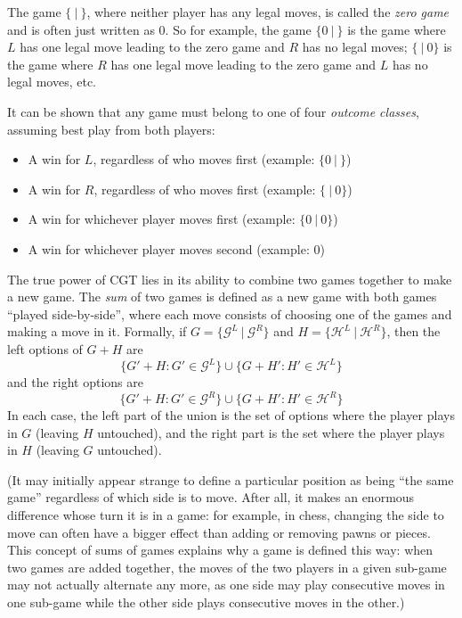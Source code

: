 \documentclass[a4paper,twocolumn]{article}
\newcommand{\cgtgame}[2]{\{#1 \:|\: #2\}}
\begin{document}
The game $\cgtgame{}{}$, where neither player has any legal moves, is
called the \emph{zero game} and is often just written as $0$. So for
example, the game $\cgtgame{0}{}$ is the game where $L$ has one legal
move leading to the zero game and $R$ has no legal moves;
$\cgtgame{}{0}$ is the game where $R$ has one legal move leading to
the zero game and $L$ has no legal moves, etc.

It can be shown that any game must belong to one of four \emph{outcome
  classes}, assuming best play from both players:

\begin{itemize}
  \item A win for $L$, regardless of who moves first (example:
    $\cgtgame{0}{}$)
  \item A win for $R$, regardless of who moves first (example:
    $\cgtgame{}{0}$)
  \item A win for whichever player moves first (example:
    $\cgtgame{0}{0}$)
  \item A win for whichever player moves second (example: $0$)
\end{itemize}

The true power of CGT lies in its ability to combine two games
together to make a new game. The \emph{sum} of two games is defined as
a new game with both games ``played side-by-side'', where each move
consists of choosing one of the games and making a move in
it. Formally, if $G = \cgtgame{\mathcal{G}^L}{\mathcal{G}^R}$ and $H =
\cgtgame{\mathcal{H}^L}{\mathcal{H}^R}$, then the left options of
$G+H$ are $$\{G'+H : G' \in \mathcal{G}^L\} \cup \{G+H' : H' \in
\mathcal{H}^L\}$$ and the right options are $$\{G'+H : G' \in
\mathcal{G}^R\} \cup \{G+H' : H' \in \mathcal{H}^R\}$$ In each case,
the left part of the union is the set of options where the player
plays in $G$ (leaving $H$ untouched), and the right part is the set
where the player plays in $H$ (leaving $G$ untouched).

(It may initially appear strange to define a particular position as
being ``the same game'' regardless of which side is to move. After
all, it makes an enormous difference whose turn it is in a game: for
example, in chess, changing the side to move can often have a bigger
effect than adding or removing pawns or pieces. This concept of sums
of games explains why a game is defined this way: when two games are
added together, the moves of the two players in a given sub-game may
not actually alternate any more, as one side may play consecutive
moves in one sub-game while the other side plays consecutive moves in
the other.)
\end{document}
